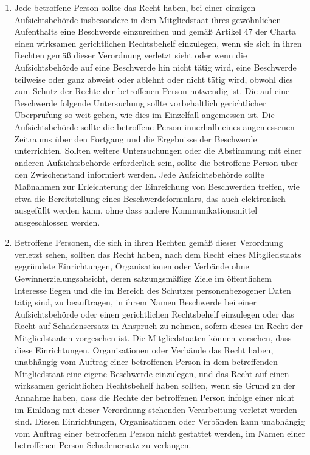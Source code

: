 \begin{enumerate}
   \item Jede betroffene Person sollte das Recht haben, bei einer einzigen Aufsichtsbehörde insbesondere in dem
    Mitgliedstaat ihres gewöhnlichen Aufenthalts eine Beschwerde einzureichen und gemäß Artikel 47 der Charta einen
    wirksamen gerichtlichen Rechtsbehelf einzulegen, wenn sie sich in ihren Rechten gemäß dieser Verordnung verletzt
    sieht oder wenn die Aufsichtsbehörde auf eine Beschwerde hin nicht tätig wird, eine Beschwerde teilweise oder ganz
    abweist oder ablehnt oder nicht tätig wird, obwohl dies zum Schutz der Rechte der betroffenen Person notwendig ist.
    Die auf eine Beschwerde folgende Untersuchung sollte vorbehaltlich gerichtlicher Überprüfung so weit gehen, wie
    dies im Einzelfall angemessen ist. Die Aufsichtsbehörde sollte die betroffene Person innerhalb eines angemessenen
    Zeitraums über den Fortgang und die Ergebnisse der Beschwerde unterrichten. Sollten weitere Untersuchungen oder die
    Abstimmung mit einer anderen Aufsichtsbehörde erforderlich sein, sollte die betroffene Person über den
    Zwischenstand informiert werden. Jede Aufsichtsbehörde sollte Maßnahmen zur Erleichterung der Einreichung von
    Beschwerden treffen, wie etwa die Bereitstellung eines Beschwerdeformulars, das auch elektronisch ausgefüllt werden
    kann, ohne dass andere Kommunikationsmittel ausgeschlossen werden.%
   \label{eg:141}
   

   \item Betroffene Personen, die sich in ihren Rechten gemäß dieser Verordnung verletzt sehen, sollten das Recht haben,
    nach dem Recht eines Mitgliedstaats gegründete Einrichtungen, Organisationen oder Verbände ohne
    Gewinnerzielungsabsicht, deren satzungsmäßige Ziele im öffentlichem Interesse liegen und die im Bereich des
    Schutzes personenbezogener Daten tätig sind, zu beauftragen, in ihrem Namen Beschwerde bei einer Aufsichtsbehörde
    oder einen gerichtlichen Rechtsbehelf einzulegen oder das Recht auf Schadensersatz in Anspruch zu nehmen, sofern
    dieses im Recht der Mitgliedstaaten vorgesehen ist. Die Mitgliedstaaten können vorsehen, dass diese Einrichtungen,
    Organisationen oder Verbände das Recht haben, unabhängig vom Auftrag einer betroffenen Person in dem betreffenden
    Mitgliedstaat eine eigene Beschwerde einzulegen, und das Recht auf einen wirksamen gerichtlichen Rechtsbehelf haben
    sollten, wenn sie Grund zu der Annahme haben, dass die Rechte der betroffenen Person infolge einer nicht im
    Einklang mit dieser Verordnung stehenden Verarbeitung verletzt worden sind. Diesen Einrichtungen, Organisationen
    oder Verbänden kann unabhängig vom Auftrag einer betroffenen Person nicht gestattet werden, im Namen einer
    betroffenen Person Schadenersatz zu verlangen.%
   \label{eg:142}
   

\end{enumerate}
